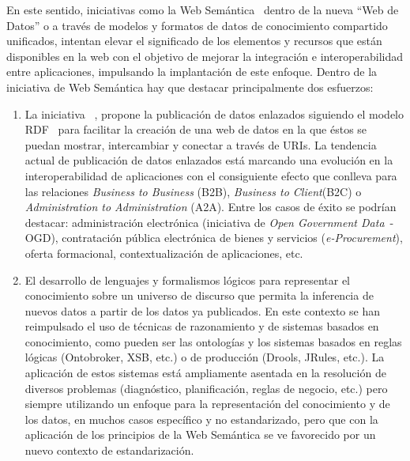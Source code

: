 \documentclass[a4paper,twoside,12pt]{report}
\begin{document}
En este sentido, iniciativas como la Web Semántica~\cite{Berners-Lee2001} dentro de la nueva ``Web de Datos'' o \wode a través de modelos y
formatos de datos de conocimiento compartido unificados, intentan elevar el
significado de los elementos y recursos que están disponibles en la web con el
objetivo de mejorar la integración e interoperabilidad entre aplicaciones, impulsando la implantación de este enfoque. Dentro de la iniciativa de Web
Semántica hay que destacar principalmente dos esfuerzos: 
\begin{enumerate}
 \item La iniciativa \linkeddata~\cite{Berners-Lee-2006}, propone la publicación de datos
enlazados siguiendo el modelo \gls{RDF}~\cite{rdf-syntax} para facilitar la creación de una web de
datos en la que éstos se puedan mostrar, intercambiar y conectar a través de
URIs. La tendencia actual de publicación de datos enlazados está marcando una
evolución en la interoperabilidad de aplicaciones con el consiguiente efecto que
conlleva para las relaciones \textit{Business to Business} (\gls{B2B}), \textit{Business to
Client}(\gls{B2C}) o \textit{Administration to Administration} (\gls{A2A}). Entre los casos de éxito
se podrían destacar: administración electrónica (iniciativa de \textit{Open Government
Data}~\cite{8-principles}-\gls{OGD}), contratación pública electrónica de bienes y servicios (\textit{\gls{e-Procurement}}), oferta
formacional, contextualización de aplicaciones, etc. 

\item El desarrollo de lenguajes y formalismos lógicos para representar el
conocimiento sobre un universo de discurso que permita la inferencia de nuevos
datos a partir de los datos ya publicados. En este contexto se han reimpulsado
el uso de técnicas de razonamiento y de sistemas basados en conocimiento, 
como pueden ser las ontologías y los sistemas basados en reglas lógicas (Ontobroker,
XSB, etc.) o de producción (Drools, JRules, etc.). La aplicación de estos
sistemas está ampliamente asentada en la resolución de diversos problemas
(diagnóstico, planificación, reglas de negocio, etc.) pero siempre utilizando un
enfoque para la representación del conocimiento y de los datos, en muchos casos
específico y no estandarizado, pero que con la aplicación de los principios
de la Web Semántica se ve favorecido por un nuevo contexto de estandarización. 
\end{enumerate}
\end{document}
